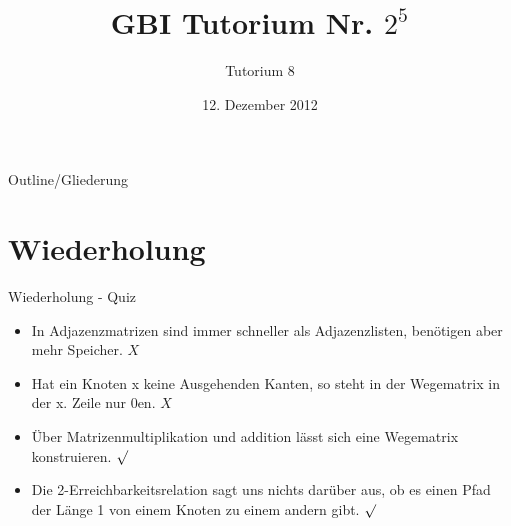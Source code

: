 

\title[Tutorium 8]{GBI Tutorium Nr. $2^5$}
\subtitle{Tutorium 8}
\date{12. Dezember 2012}






	\begin{frame}
		\titlepage
	\end{frame}

	\begin{frame}{Outline/Gliederung}
		\tableofcontents
	\end{frame}	
		
	
	
	\section{Wiederholung} 
	\begin{frame} {Wiederholung - Quiz}
		\begin{itemize}
			\item In Adjazenzmatrizen sind immer schneller als Adjazenzlisten, benötigen aber mehr Speicher.
			\only<2-> {\color{red}$X$}\\
			\color{black}
					
			\item Hat ein Knoten x keine Ausgehenden Kanten, so steht in der Wegematrix in der x. Zeile nur 0en.
			\only<3-> {\color{red}$X$}\\
			\color{black}
	
			\item Über Matrizenmultiplikation und addition lässt sich eine Wegematrix konstruieren.
			\only<4-> {\color{darkgreen}$\surd$}\\
			\color{black}
			
			\item Die 2-Erreichbarkeitsrelation sagt uns nichts darüber aus, ob es einen Pfad der Länge 1 von einem Knoten zu einem andern gibt.
			\only<4-> {\color{darkgreen}$\surd$}\\
			\color{black}
		\end{itemize}
	\end{frame}
	
	
	
